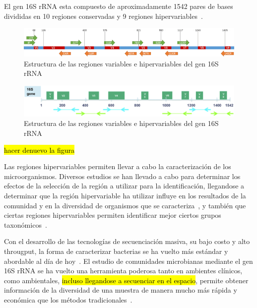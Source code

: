 El gen 16S rRNA esta compuesto de aproximadamente 1542 pares de bases divididas en 10 regiones conservadas y 9 regiones hipervariables~\cite{clarridge2004impact}.%
\begin{figure}[H]
    \centering
    \includegraphics[width=1\linewidth]{images/16S.png}
    \caption{Estructura de las regiones variables e hipervariables del gen 16S rRNA}
    \label{fig:16S_structure}
\end{figure}
\begin{figure}[H]
    \centering
    \includegraphics[width=1\linewidth]{images/16S_2.png}
    \caption{Estructura de las regiones variables e hipervariables del gen 16S rRNA}
    \label{fig:16S_structure2}
\end{figure}

\hl{hacer denuevo la figura}

Las regiones hipervariables permiten llevar a cabo la caracterización de los microorganismos. Diversos estudios se han llevado a cabo para determinar los efectos de la selección de la región a utilizar para la identificación, llegandose a determinar que la región hipervariable ha utilizar influye en los resultados de la comunidad y en la diversidad de organismos que se caracteriza~\cite{klindworth2013evaluation,mizrahi2013taxonomic,guo2013taxonomic,soergel2012selection}, y también que ciertas regiones hipervariables permiten identificar mejor ciertos grupos taxonómicos~\cite{buscar}.




Con el desarrollo de las tecnologías de secuenciación masiva, su bajo costo y alto througput, la forma de caracterizar bacterias se ha vuelto más estándar y abordable al día de hoy~\cite{woo2008then, tanner1994impact}. El estudio de comunidades microbianas mediante el gen 16S rRNA se ha vuelto una herramienta poderosa tanto en ambientes clínicos, como ambientales, \hl{incluso llegandose a secuenciar en el espacio}, permite obtener información de la diversidad de una muestra de manera mucho más rápida y económica que los métodos tradicionales~\cite{buscar}.
